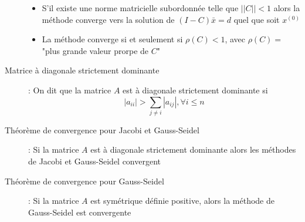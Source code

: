 \begin{description}
\begin{itemize}
        \item S'il existe une norme matricielle subordonnée telle que $||C||<1$ alors la méthode converge vers la solution de $(I-C)\bar x=d$ quel que soit $x^{(0)}$
        \item La méthode converge si et seulement si $\rho(C)<1$, avec $\rho(C)=$"plus grande valeur prorpe de $C$"
    \end{itemize}
\item[Matrice à diagonale strictement dominante] : On dit que la matrice $A$ est à diagonale strictement dominante si 
    \[
        |a_{ii}|>\sum_{j\ne i}|a_{ij}|, \forall i\le n
    \]
\item[Théorème de convergence pour Jacobi et Gauss-Seidel] : Si la matrice $A$ est à diagonale strictement dominante alors les méthodes de Jacobi et Gauss-Seidel convergent
\item[Théorème de convergence pour Gauss-Seidel] : Si la matrice $A$ est symétrique définie positive, alors la méthode de Gauss-Seidel est convergente
\end{description}